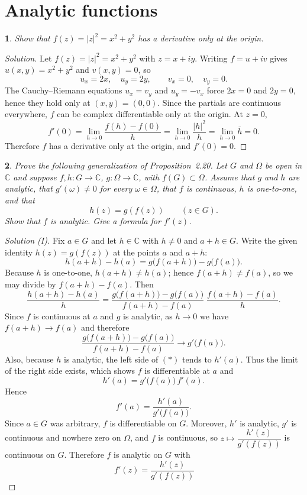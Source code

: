\documentclass[12pt, a4paper]{report}
\theoremstyle{spaced}
\newtheorem{exercise}{}
\newcommand{\setexercise}[1]{\setcounter{exercise}{#1-1}}
\begin{document}
\section{Analytic functions}

\setexercise{1}
\begin{exercise}
	Show that \( f(z)=|z|^{2}=x^{2}+y^{2} \) has a derivative only at the origin.
\end{exercise}

\begin{proof}[Solution]
	Let \(f(z)=|z|^{2}=x^{2}+y^{2}\) with \(z=x+iy\). Writing \(f=u+iv\) gives
	\(u(x,y)=x^{2}+y^{2}\) and \(v(x,y)=0\), so
	\[
		u_x=2x,\quad u_y=2y,\qquad v_x=0,\quad v_y=0.
	\]
	The Cauchy–Riemann equations \(u_x=v_y\) and \(u_y=-v_x\) force \(2x=0\) and \(2y=0\),
	hence they hold only at \((x,y)=(0,0)\). Since the partials are continuous everywhere,
	\(f\) can be complex differentiable only at the origin.
	At \(z=0\),
	\[
		f'(0)=\lim_{h\to 0}\frac{f(h)-f(0)}{h}
		=\lim_{h\to 0}\frac{|h|^{2}}{h}
		=\lim_{h\to 0}\overline{h}=0.
	\]
	Therefore \(f\) has a derivative only at the origin, and \(f'(0)=0\). \qedhere
\end{proof}


\setexercise{10}
\begin{exercise}
	Prove the following generalization of Proposition~2.20. Let \(G\) and \(\Omega\) be open in \(\mathbb{C}\) and suppose \(f,h: G\to\mathbb{C}\), \(g:\Omega\to\mathbb{C}\), with \(f(G)\subset\Omega\). Assume that \(g\) and \(h\) are analytic, that \(g'(\omega)\neq 0\) for every \(\omega\in\Omega\), that \(f\) is continuous, \(h\) is one-to-one, and that
	\[
		h(z)=g(f(z))\qquad(z\in G).
	\]
	Show that \(f\) is analytic. Give a formula for \(f'(z)\).
\end{exercise}


\begin{proof}[Solution (I)]
	Fix \(a\in G\) and let \(h\in\mathbb{C}\) with \(h\neq0\) and \(a+h\in G\).
	Write the given identity \(h(z)=g(f(z))\) at the points \(a\) and \(a+h\):
	\[
		h(a+h)-h(a)=g\big(f(a+h)\big)-g\big(f(a)\big).
	\]
	Because \(h\) is one-to-one, \(h(a+h)\neq h(a)\); hence \(f(a+h)\neq f(a)\), so we may divide by
	\(f(a+h)-f(a)\). Then
	\[
		\frac{h(a+h)-h(a)}{h}
		=\frac{g\big(f(a+h)\big)-g\big(f(a)\big)}{\,f(a+h)-f(a)\,}\;
		\frac{f(a+h)-f(a)}{h}.
		\tag{*}
	\]
	Since \(f\) is continuous at \(a\) and \(g\) is analytic, as \(h\to0\) we have
	\(f(a+h)\to f(a)\) and therefore
	\[
		\frac{g\big(f(a+h)\big)-g\big(f(a)\big)}{\,f(a+h)-f(a)\,}\longrightarrow g'\!\big(f(a)\big).
	\]
	Also, because \(h\) is analytic, the left side of \((*)\) tends to \(h'(a)\).
	Thus the limit of the right side exists, which shows \(f\) is differentiable at \(a\) and
	\[
		h'(a)=g'\!\big(f(a)\big)\,f'(a).
	\]
	Hence
	\[
		f'(a)=\frac{h'(a)}{g'\!\big(f(a)\big)}.
	\]
	Since \(a\in G\) was arbitrary, \(f\) is differentiable on \(G\). Moreover,
	\(h'\) is analytic, \(g'\) is continuous and nowhere zero on \(\Omega\), and \(f\) is continuous, so
	\(z\mapsto \dfrac{h'(z)}{g'(f(z))}\) is continuous on \(G\).
	Therefore \(f\) is analytic on \(G\) with
	\[
		\,f'(z)=\dfrac{h'(z)}{g'(f(z))}
	\]
\end{proof}
\end{document}
